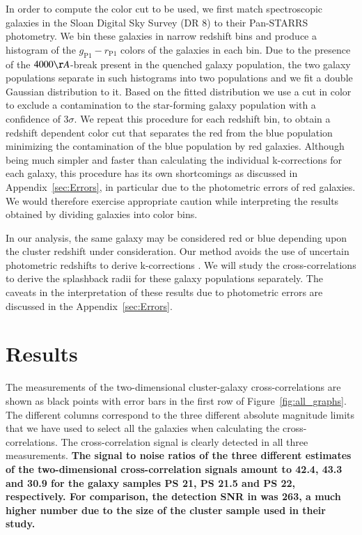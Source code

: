 \documentclass[iop, apjl, twocolappendix, numberedappendix]{emulateapj}
\begin{document}
In order to compute the color cut to be used, we first match spectroscopic
galaxies in the Sloan Digital Sky Survey (DR 8) to their
Pan-STARRS photometry. We bin these galaxies in narrow redshift bins and
produce a histogram of the $g_{\mathrm{P1}}-r_{\mathrm{P1}}$ colors of the
galaxies in each bin. Due to the presence of the $4000\AA$-break present in the
quenched galaxy population, the two galaxy populations separate in such histograms
into two populations and we fit a double Gaussian distribution to it.
Based on the fitted distribution we use a cut in color to exclude a
contamination to the star-forming galaxy population with a confidence
of 3$\sigma$. We repeat this procedure for each redshift bin, to obtain a redshift
dependent color cut that separates the red from the blue population minimizing
the contamination of the blue population by red galaxies. Although being much
simpler and faster than calculating the individual k-corrections for each
galaxy, this procedure has its own shortcomings as discussed in
Appendix~\ref{sec:Errors}, in particular due to the photometric errors of red
galaxies. We would therefore exercise appropriate caution while interpreting
the results obtained by dividing galaxies into color bins.

In our analysis, the same galaxy may be considered red or blue depending upon
the cluster redshift under consideration. Our method avoids the use of
uncertain photometric redshifts to derive k-corrections
\citep[cf.][]{baxter2017halo}. We will study the cross-correlations to derive
the splashback radii for these galaxy populations separately. The caveats in
the interpretation of these results due to photometric errors are discussed in the
Appendix~\ref{sec:Errors}.

\section{Results}
\label{sec:Results}
The measurements of the two-dimensional cluster-galaxy
cross-correlations are shown as black points with error bars in the
first row of Figure~\ref{fig:all_graphs}. The different columns
correspond to the three different absolute magnitude limits that we
have used to select all the galaxies when calculating the
cross-correlations. The cross-correlation signal is clearly detected
in all three measurements. \textbf{The signal to noise ratios of the
three different estimates of the two-dimensional cross-correlation signals
amount to 42.4, 43.3 and 30.9 for the galaxy samples PS 21, PS 21.5 and PS 22,
respectively. For comparison, the detection SNR in \citet{more2016detection}
was 263, a much higher number due to the size of the cluster sample used in
their study.}
\end{document}
